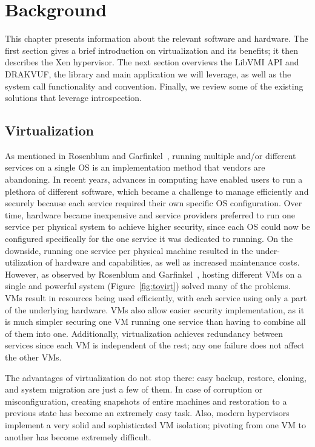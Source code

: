\chapter{Background}\label{ch:background}

This chapter presents information about the relevant software and hardware. The first section gives a brief introduction on virtualization and its benefits; it then describes the Xen hypervisor. The next section overviews the LibVMI \ac{API} and DRAKVUF, the library and main application we will leverage, as well as the system call functionality and convention. Finally, we review some of the existing solutions that leverage introspection.

\section{Virtualization}\label{sec:virtualization}
As mentioned in Rosenblum and Garfinkel~\cite{rosenblum2005virtual}, running multiple and/or different services on a single \ac{OS} is an implementation method that vendors are abandoning. In recent years, advances in computing have enabled users to run a plethora of different software, which became a challenge to manage efficiently and securely because each service required their own specific \ac{OS} configuration. Over time, hardware became inexpensive and service providers preferred to run one service per physical system to achieve higher security, since each \ac{OS} could now be configured specifically for the one service it was dedicated to running. On the downside, running one service per physical machine resulted in the under-utilization of hardware and capabilities, as well as increased maintenance costs. However, as observed by Rosenblum and Garfinkel~\cite{rosenblum2005virtual}, hosting different \ac{VM}s on a single and powerful system (Figure~\ref{fig:tovirt}) solved many of the problems. \ac{VM}s result in resources being used efficiently, with each service using only a part of the underlying hardware. \acp{VM} also allow easier security implementation, as it is much simpler securing one \ac{VM} running one service than having to combine all of them into one. Additionally, virtualization achieves redundancy between services since each \ac{VM} is independent of the rest; any one failure does not affect the other \ac{VM}s.

\par The advantages of virtualization do not stop there: easy backup, restore, cloning, and system migration are just a few of them. In case of corruption or misconfiguration, creating snapshots of entire machines and restoration to a previous state has become an extremely easy task. Also, modern hypervisors implement a very solid and sophisticated \ac{VM} isolation; pivoting from one \ac{VM} to another has become extremely difficult.

